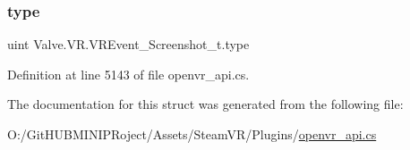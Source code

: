 \subsubsection{\texorpdfstring{type}{type}}
{\footnotesize\ttfamily uint Valve.\+V\+R.\+V\+R\+Event\+\_\+\+Screenshot\+\_\+t.\+type}



Definition at line 5143 of file openvr\+\_\+api.\+cs.



The documentation for this struct was generated from the following file\+:\begin{DoxyCompactItemize}
\item 
O\+:/\+Git\+H\+U\+B\+M\+I\+N\+I\+P\+Roject/\+Assets/\+Steam\+V\+R/\+Plugins/\mbox{\hyperlink{openvr__api_8cs}{openvr\+\_\+api.\+cs}}\end{DoxyCompactItemize}
